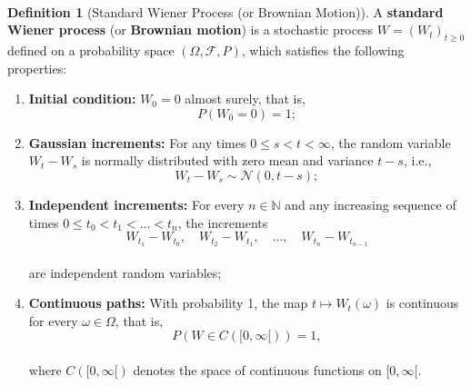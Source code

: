 \documentclass[
  11pt,
  a4paper,
]{book}
\theoremstyle{definition}
\newtheorem{definition}{Definition}[chapter]
\theoremstyle{definition}
\theoremstyle{definition}
\theoremstyle{definition}
\theoremstyle{remark}
\begin{document}
\(\,\)

\begin{definition}[Standard Wiener Process (or Brownian Motion)]

A \textbf{standard Wiener process} (or \textbf{Brownian motion}) is a stochastic process \(W = (W_t)_{t \geq 0}\) defined on a probability space \((\Omega, \mathcal{F}, P)\), which satisfies the following properties:

\begin{enumerate}
\def\labelenumi{\arabic{enumi}.}
\item
  \textbf{Initial condition:} \(W_0 = 0\) almost surely, that is,\\
  \[
  P(W_0 = 0) = 1;
  \]
\item
  \textbf{Gaussian increments:} For any times \(0 \leq s < t < \infty\), the random variable \(W_t - W_s\) is normally distributed with zero mean and variance \(t - s\), i.e.,\\
  \[
  W_t - W_s \sim \mathcal{N}(0, t - s);
  \]
\item
  \textbf{Independent increments:} For every \(n \in \mathbb{N}\) and any increasing sequence of times \(0 \leq t_0 < t_1 < \dots < t_n\), the increments\\
  \[
  W_{t_1} - W_{t_0}, \quad W_{t_2} - W_{t_1}, \quad \dots, \quad W_{t_n} - W_{t_{n-1}}
  \]\\
  are independent random variables;
\item
  \textbf{Continuous paths:} With probability 1, the map \(t \mapsto W_t(\omega)\) is continuous for every \(\omega \in \Omega\), that is,\\
  \[
  P\left( W \in C([0, \infty[) \right) = 1,
  \]\\
  where \(C([0, \infty[)\) denotes the space of continuous functions on \([0, \infty[\).
\end{enumerate}

\end{definition}

\(\,\)
\end{document}
